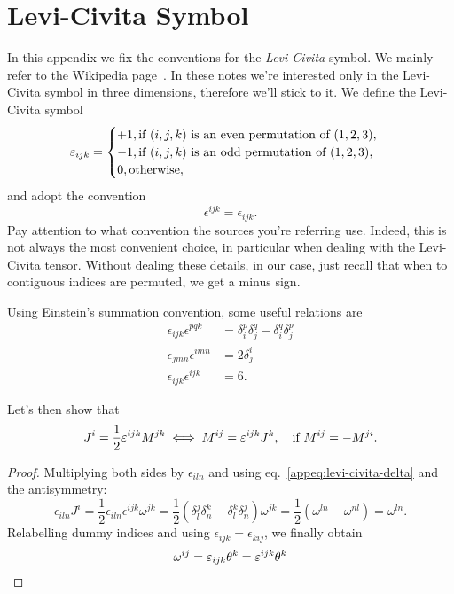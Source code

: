 \section{Levi-Civita Symbol}\label{app:levi-civita}
In this appendix we fix the conventions for the \emph{Levi-Civita} symbol. We mainly refer to the Wikipedia page~\cite{wikipedia}. In these notes we're interested only in the Levi-Civita symbol in three dimensions, therefore we'll stick to it. We define the Levi-Civita symbol
\begin{equation}
    \epsilon_{ijk} = 
    \begin{cases}
        +1, \textup{if $(i,j,k)$ is an even permutation of $(1,2,3)$}, \\
        -1, \textup{if $(i,j,k)$ is an odd permutation of $(1,2,3)$},\\
        0, \textup{otherwise} ,
    \end{cases}
\end{equation}
and adopt the convention
\begin{equation*}
    \epsilon^{ijk} = \epsilon_{ijk}.
\end{equation*}
Pay attention to what convention the sources you're referring use. Indeed, this is not always the most convenient choice, in particular when dealing with the Levi-Civita tensor. Without dealing these details, in our case, just recall that when to contiguous indices are permuted, we get a minus sign.

Using Einstein's summation convention, some useful relations are
\begin{subequations}
\begin{align}
    \epsilon_{ijk} \epsilon^{pqk} &= \delta^p_i \delta^q_j - \delta^q_i \delta^p_j \label{appeq:levi-civita-delta} \\
    \epsilon_{jmn} \epsilon^{imn} &= 2 \delta^i_j \\
    \epsilon_{ijk} \epsilon^{ijk} &= 6 .
\end{align}
\end{subequations}

Let's then show that
\begin{equation*}
    J^i = \frac{1}{2} \epsilon^{ijk} M^{jk} \iff M^{ij} = \epsilon^{ijk} J^k, \quad \textup{if $M^{ij} = -M^{ji}$.}
\end{equation*}
\begin{proof}
    Multiplying both sides by $\epsilon_{iln}$ and using eq.~\eqref{appeq:levi-civita-delta} and the antisymmetry:
    \begin{equation*}
        \epsilon_{iln} J^i = \frac{1}{2} \epsilon_{iln} \epsilon^{ijk} \omega^{jk} = \frac{1}{2} ( \delta^j_l \delta^k_n - \delta^k_l \delta^j_n ) \omega^{jk} = \frac{1}{2} (\omega^{ln} - \omega^{nl}) = \omega^{ln} .
    \end{equation*}
    Relabelling dummy indices and using $\epsilon_{ijk} = \epsilon_{kij}$, we finally obtain
    \begin{equation*}
        \omega^{ij} = \epsilon_{ijk} \theta^k = \epsilon^{ijk} \theta^k \qedhere
    \end{equation*}

\end{proof}